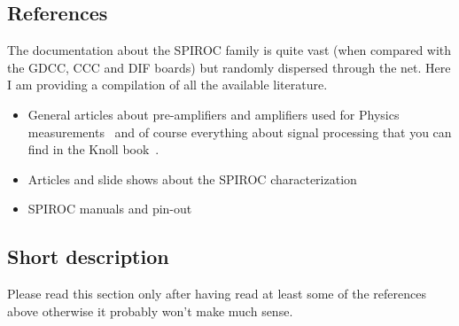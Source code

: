 \subsection{References}
The documentation about the SPIROC family is quite vast (when compared with the
GDCC, CCC and DIF boards) but randomly dispersed through the net. Here I am
providing a compilation of all the available literature.

\begin{itemize}
\item General articles about pre-amplifiers and amplifiers used for Physics
  measurements~\cite{Hamamatsu:2001,Bertuccio:1996,Lioliou:2015,Ortec} and of
  course everything about signal processing that you can find in the Knoll
  book~\cite{Knoll:2010radiation}.
\item Articles and slide shows about the SPIROC
  characterization~\cite{Callier:2008,Callier:2009,Fabbri:2009,%
    Callier:2013,Callier:2015}
\item SPIROC manuals and
  pin-out~\cite{SPIROC2Dpinlist,SPIROC2Ddatasheet,SPIROC:OMEGA}
\end{itemize}

\subsection{Short description}
Please read this section only after having read at least some of the references
above otherwise it probably won't make much sense.

